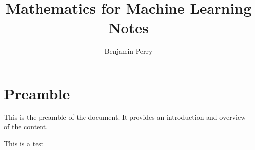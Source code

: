 \documentclass[a4paper]{report}
\title{Mathematics for Machine Learning Notes}
\author{Benjamin Perry}
\newcommand{\preamble}{
  \chapter*{Preamble}
  This is the preamble of the document. It provides an introduction and overview of the content.
}
\begin{document}
\maketitle
\tableofcontents

\preamble



This is a test \cite{brixi2023salt}

\printbibliography
\end{document}
